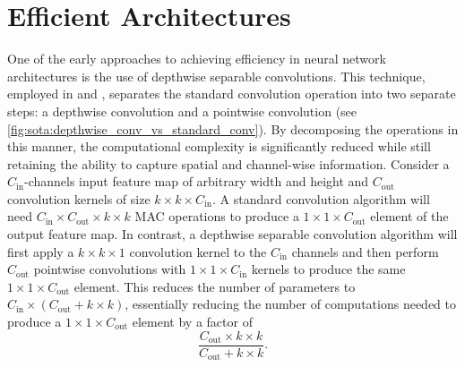 
\section{Efficient Architectures}


One of the early approaches to achieving efficiency in neural network
architectures is the use of depthwise separable convolutions. This technique,
employed in \cite{howard2017mobilenets} and \cite{DBLP:conf/icml/TanL19},
separates the standard convolution operation into two separate steps: a
depthwise convolution and a pointwise convolution (see
\cref{fig:sota:depthwise_conv_vs_standard_conv}). By decomposing the operations
in this manner, the computational complexity is significantly reduced while
still retaining the ability to capture spatial and channel-wise information.
Consider a $C_\text{in}$-channels input feature map of arbitrary width and
height and $C_\text{out}$ convolution kernels of size $k\times k \times
C_\text{in}$. A standard convolution algorithm will need $C_\text{in} \times
C_\text{out} \times k \times k$ \ac{MAC} operations to produce a $1 \times 1
\times C_\text{out}$ element of the output feature map. In contrast, a depthwise
separable convolution algorithm will first apply a $k\times k \times 1$
convolution kernel to the $C_\text{in}$ channels and then perform $C_\text{out}$
pointwise convolutions with $1\times 1 \times C_\text{in}$ kernels to produce
the same $1\times 1 \times C_\text{out}$ element. This reduces the number of parameters to
$C_\text{in} \times (C_\text{out} + k \times k)$, essentially reducing the
number of computations needed to produce a $1 \times 1 \times C_\text{out}$
element by a factor of\\

$$\displaystyle\frac{C_\text{out}\times k \times k}{C_\text{out} + k \times k}.$$\\

